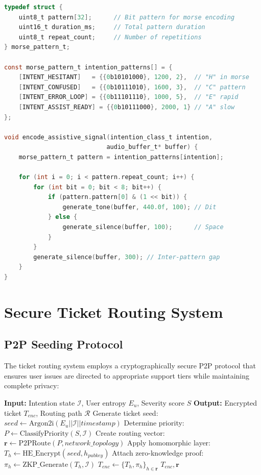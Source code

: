 \documentclass[11pt,a4paper]{article}
\begin{document}
\begin{lstlisting}[language=C, caption=Morse-Pattern Encoder for Assistive Cues]
typedef struct {
    uint8_t pattern[32];      // Bit pattern for morse encoding
    uint16_t duration_ms;     // Total pattern duration
    uint8_t repeat_count;     // Number of repetitions
} morse_pattern_t;

const morse_pattern_t intention_patterns[] = {
    [INTENT_HESITANT]   = {{0b10101000}, 1200, 2},  // "H" in morse
    [INTENT_CONFUSED]   = {{0b10111010}, 1600, 3},  // "C" pattern
    [INTENT_ERROR_LOOP] = {{0b11101110}, 1000, 5},  // "E" rapid
    [INTENT_ASSIST_READY] = {{0b10111000}, 2000, 1} // "A" slow
};

void encode_assistive_signal(intention_class_t intention,
                            audio_buffer_t* buffer) {
    morse_pattern_t pattern = intention_patterns[intention];
    
    for (int i = 0; i < pattern.repeat_count; i++) {
        for (int bit = 0; bit < 8; bit++) {
            if (pattern.pattern[0] & (1 << bit)) {
                generate_tone(buffer, 440.0f, 100); // Dit
            } else {
                generate_silence(buffer, 100);      // Space
            }
        }
        generate_silence(buffer, 300); // Inter-pattern gap
    }
}
\end{lstlisting}

\section{Secure Ticket Routing System}

\subsection{P2P Seeding Protocol}

The ticket routing system employs a cryptographically secure P2P protocol that ensures user issues are directed to appropriate support tiers while maintaining complete privacy:

\begin{algorithm}
\caption{Privacy-Preserving P2P Ticket Seeding}
\begin{algorithmic}[1]
\STATE \textbf{Input:} Intention state $\mathcal{I}$, User entropy $E_u$, Severity score $S$
\STATE \textbf{Output:} Encrypted ticket $T_{enc}$, Routing path $\mathcal{R}$
\STATE Generate ticket seed: $seed \leftarrow \text{Argon2i}(E_u || \mathcal{I} || timestamp)$
\STATE Determine priority: $P \leftarrow \text{ClassifyPriority}(S, \mathcal{I})$
\STATE Create routing vector: $\mathbf{r} \leftarrow \text{P2PRoute}(P, network\_topology)$
    \STATE Apply homomorphic layer: $T_{h} \leftarrow \text{HE\_Encrypt}(seed, h_{pubkey})$
    \STATE Attach zero-knowledge proof: $\pi_h \leftarrow \text{ZKP\_Generate}(T_h, \mathcal{I})$
\ENDFOR
\STATE $T_{enc} \leftarrow \{T_h, \pi_h\}_{h \in \mathbf{r}}$
\RETURN $T_{enc}, \mathbf{r}$
\end{algorithmic}
\end{algorithm}
\end{document}

